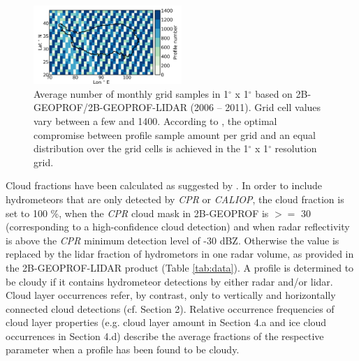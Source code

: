 \documentclass[alpha-refs]{wiley-article}
\begin{document}
\begin{figure}
\noindent
\includegraphics[width=0.5\textwidth]{mon_avg_profilenr.png}
\caption{Average number of monthly grid samples in 1$^{\circ}$ x 1$^{\circ}$ based on 2B-GEOPROF/2B-GEOPROF-LIDAR (2006 -- 2011). Grid cell values vary between a few and 1400. According to \citet{cu16}, the optimal compromise between profile sample amount per grid and an equal distribution over the grid cells is achieved in the 1$^{\circ}$ x 1$^{\circ}$ resolution grid.}
\label{fig:monthly_profiles}
\end{figure}



Cloud fractions have been calculated as suggested by \citet{cl14}. In order to include hydrometeors that are only detected by \textit{CPR} or \textit{CALIOP}, the cloud fraction is set to 100 \%, when the \textit{CPR} cloud mask in 2B-GEOPROF is $>=$ 30 (corresponding to a high-confidence cloud detection) and when radar reflectivity is above the \textit{CPR} minimum detection level of -30 dBZ. Otherwise the value is replaced by the lidar fraction of hydrometors in one radar volume, as provided in the 2B-GEOPROF-LIDAR product (Table \ref{tab:data}). A profile is determined to be cloudy if it contains hydrometeor detections by either radar and/or lidar. Cloud layer occurrences refer, by contrast, only to vertically and horizontally connected cloud detections (cf. Section 2). Relative occurrence frequencies of cloud layer properties (e.g. cloud layer amount in Section 4.a  and ice cloud occurrences in Section 4.d) describe the average fractions of the respective parameter when a profile has been found to be cloudy. 
\end{document}
